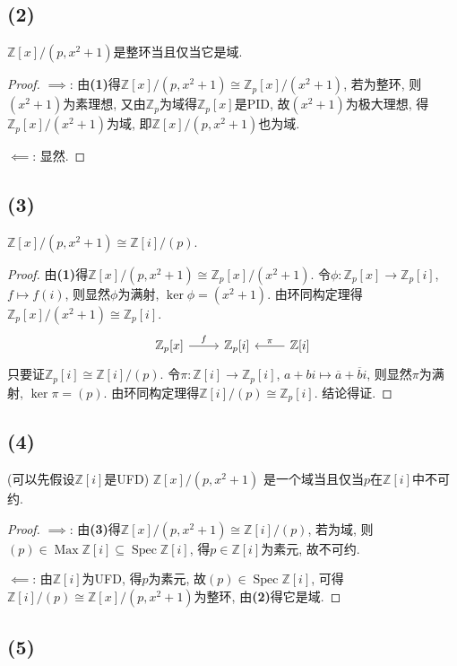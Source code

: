\documentclass[12pt, a4paper, fontset=windows]{ctexart}
\newcommand{\Z}{\mathbb{Z}}
\newcommand{\Max}{\operatorname{Max}}
\newcommand{\Spec}{\operatorname{Spec}}
\newcommand{\cl}[1]{\overline{#1}} %
\newcommand{\isom}{\cong} %
\begin{document}
\subsection*{(2)}

$\Z[x]/(p,x^2+1)$是整环当且仅当它是域. 

\begin{proof}
$\implies$: 由{\bf (1)}得$\Z[x]/(p,x^2+1)\isom\Z_p[x]/(x^2+1)$, 
若为整环, 则$(x^2+1)$为素理想, 又由$\Z_p$为域得$\Z_p[x]$是PID, 
故$(x^2+1)$为极大理想, 得$\Z_p[x]/(x^2+1)$为域, 即$\Z[x]/(p,x^2+1)$也为域. 

$\impliedby$: 显然. 
\end{proof}

\subsection*{(3)}

$\Z[x]/(p,x^2+1)\isom\Z[i]/(p)$. 

\begin{proof}
由{\bf (1)}得$\Z[x]/(p,x^2+1)\isom\Z_p[x]/(x^2+1)$. 
令$\phi:\Z_p[x]\to\Z_p[i]$, $f\mapsto f(i)$, 
则显然$\phi$为满射, $\ker\phi=(x^2+1)$. 
由环同构定理得$\Z_p[x]/(x^2+1)\isom\Z_p[i]$. 
\[\begin{tikzcd}
\Z_p[x]\ar[r,"f"]&\Z_p[i]&\Z[i]\ar[l,"\pi"']
\end{tikzcd}\]
只要证$\Z_p[i]\isom\Z[i]/(p)$. 令$\pi:\Z[i]\to\Z_p[i]$, 
$a+bi\mapsto\cl{a}+\cl{b}i$, 则显然$\pi$为满射, $\ker\pi=(p)$. 
由环同构定理得$\Z[i]/(p)\isom\Z_p[i]$. 结论得证. 
\end{proof}

\subsection*{(4)}

(可以先假设$\Z[i]$是UFD) $\Z[x]/(p,x^2+1)$
是一个域当且仅当$p$在$\Z[i]$中不可约. 

\begin{proof}
$\implies$: 由{\bf (3)}得$\Z[x]/(p,x^2+1)\isom\Z[i]/(p)$, 
若为域, 则$(p)\in\Max\Z[i]\subseteq\Spec\Z[i]$, 
得$p\in\Z[i]$为素元, 故不可约. 

$\impliedby$: 由$\Z[i]$为UFD, 得$p$为素元, 故$(p)\in\Spec\Z[i]$, 
可得$\Z[i]/(p)\isom\Z[x]/(p,x^2+1)$为整环, 由{\bf (2)}得它是域. 
\end{proof}

\subsection*{(5)}
\end{document}
